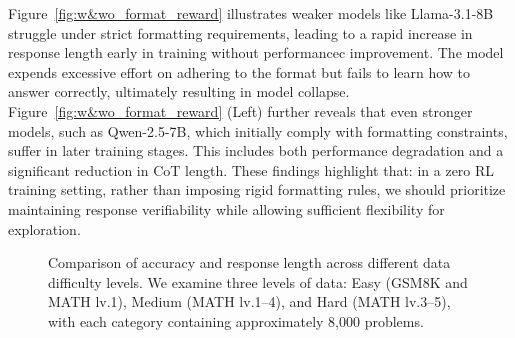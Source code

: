 \documentclass{article} %
\newcommand{\wz}[1]{\textcolor{brown}{\bf\small [#1 --WZ]}}
\begin{document}
Figure~\ref{fig:w&wo_format_reward} illustrates weaker models like Llama-3.1-8B struggle under strict formatting requirements, leading to a rapid increase in response length early in training without performancec improvement. The model expends excessive effort on adhering to the format but fails to learn how to answer correctly, ultimately resulting in model collapse. 
Figure~\ref{fig:w&wo_format_reward} (Left) further reveals that even stronger models, such as Qwen-2.5-7B, which initially comply with formatting constraints, suffer in later training stages. This includes both performance degradation and a significant reduction in CoT length.  
These findings highlight that: in a zero RL training setting, rather than imposing rigid formatting rules, we should prioritize maintaining response verifiability while allowing sufficient flexibility for exploration.

\begin{figure*}[!t]
    \centering
    \caption{Comparison of accuracy and response length across different data difficulty levels. We examine three levels of data: Easy (GSM8K and MATH lv.1), Medium (MATH lv.1–4), and Hard (MATH lv.3–5), with each category containing approximately 8,000 problems.}
    \label{fig:mathlv}
\end{figure*}
\end{document}
